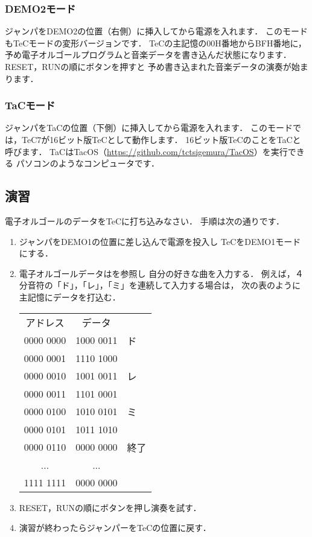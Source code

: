 \subsubsection{DEMO2モード}
ジャンパをDEMO2の位置（右側）に挿入してから電源を入れます．
このモードもTeCモードの変形バージョンです．
TeCの主記憶の00H番地からBFH番地に，
予め電子オルゴールプログラムと音楽データを書き込んだ状態になります．
RESET，RUNの順にボタンを押すと
予め書き込まれた音楽データの演奏が始まります．

\subsubsection{TaCモード}
ジャンパをTaCの位置（下側）に挿入してから電源を入れます．
このモードでは，TeC7が16ビット版TeCとして動作します．
16ビット版TeCのことをTaCと呼びます．
TaCはTacOS（\url{https://github.com/tctsigemura/TacOS}）を実行できる
パソコンのようなコンピュータです．

\subsection*{演習}

電子オルゴールのデータをTeCに打ち込みなさい．
手順は次の通りです．

\begin{enumerate}
\item ジャンパをDEMO1の位置に差し込んで電源を投入し
  TeCをDEMO1モードにする．
\item 電子オルゴールデータはを参照し
  自分の好きな曲を入力する．
  例えば，４分音符の「ド」，「レ」，「ミ」を連続して入力する場合は，
  次の表のように主記憶にデータを打込む．

  {\ttfamily\small\begin{center}
    \begin{tabular}{| c | c | l }\cline{1-2}
      アドレス  & データ \\\cline{1-2}
      0000 0000 & 1000 0011 & ド   \\
      0000 0001 & 1110 1000 &      \\
      0000 0010 & 1001 0011 & レ   \\
      0000 0011 & 1101 0001 &      \\
      0000 0100 & 1010 0101 & ミ   \\
      0000 0101 & 1011 1010 &      \\
      0000 0110 & 0000 0000 & 終了 \\
      ...     &   ...     &      \\
      1111 1111 & 0000 0000 &      \\\cline{1-2}
    \end{tabular}
  \end{center}}

\item RESET，RUNの順にボタンを押し演奏を試す．

\item 演習が終わったらジャンパーをTeCの位置に戻す．
\end{enumerate}
